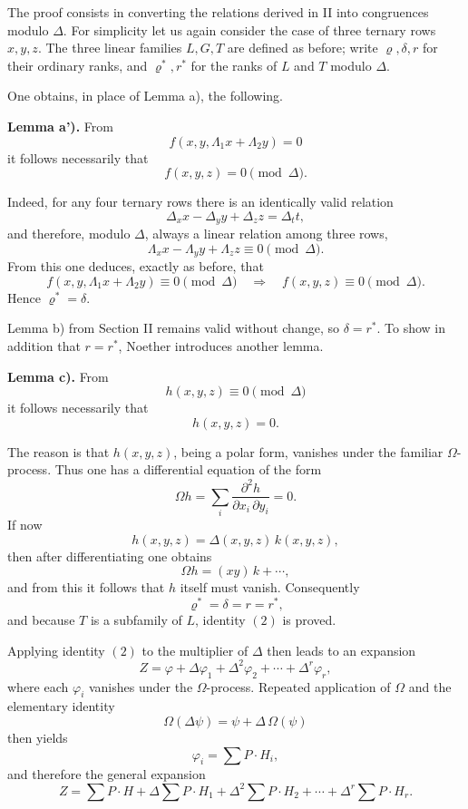 \documentclass[11pt]{article}
\begin{document}
The proof consists in converting the relations derived in II into congruences modulo \(\Delta\). For simplicity let us again consider the case of three ternary rows \(x,y,z\). The three linear families \(L,G,T\) are defined as before; write \(\varrho,\delta,r\) for their ordinary ranks, and \(\varrho^*,r^*\) for the ranks of \(L\) and \(T\) modulo \(\Delta\).

One obtains, in place of Lemma a), the following.

\medskip
\noindent\textbf{Lemma a').}
From
\[
f(x,y,\Lambda_1x+\Lambda_2y)=0
\]
it follows necessarily that
\[
f(x,y,z)=0\pmod{\Delta}.
\]

Indeed, for any four ternary rows there is an identically valid relation
\[
\Delta_x x-\Delta_y y+\Delta_z z=\Delta_t t,
\]
and therefore, modulo \(\Delta\), always a linear relation among three rows,
\[
\Lambda_x x-\Lambda_y y+\Lambda_z z\equiv 0 \pmod{\Delta}.
\]
From this one deduces, exactly as before, that
\[
f(x,y,\Lambda_1x+\Lambda_2y)\equiv 0 \pmod{\Delta}
\quad\Rightarrow\quad
f(x,y,z)\equiv 0 \pmod{\Delta}.
\]
Hence \(\varrho^*=\delta\).

Lemma b) from Section II remains valid without change, so \(\delta=r^*\). To show in addition that \(r=r^*\), Noether introduces another lemma.

\medskip
\noindent\textbf{Lemma c).}
From
\[
h(x,y,z)\equiv 0 \pmod{\Delta}
\]
it follows necessarily that
\[
h(x,y,z)=0.
\]

The reason is that \(h(x,y,z)\), being a polar form, vanishes under the familiar \(\Omega\)-process. Thus one has a differential equation of the form
\[
\Omega h=\sum_i \frac{\partial^2 h}{\partial x_i\,\partial y_i}=0.
\]
If now
\[
h(x,y,z)=\Delta(x,y,z)\,k(x,y,z),
\]
then after differentiating one obtains
\[
\Omega h=(xy)\,k+\cdots,
\]
and from this it follows that \(h\) itself must vanish. Consequently
\[
\varrho^*=\delta=r=r^*,
\]
and because \(T\) is a subfamily of \(L\), identity \((2)\) is proved.

Applying identity \((2)\) to the multiplier of \(\Delta\) then leads to an expansion
\[
Z=\varphi+\Delta\varphi_1+\Delta^2\varphi_2+\cdots+\Delta^r\varphi_r,
\]
where each \(\varphi_i\) vanishes under the \(\Omega\)-process. Repeated application of \(\Omega\) and the elementary identity
\[
\Omega(\Delta\psi)=\psi+\Delta\,\Omega(\psi)
\]
then yields
\[
\varphi_i=\sum P\cdot H_i,
\]
and therefore the general expansion
\[
Z=
\sum P\cdot H
+\Delta\sum P\cdot H_1
+\Delta^2\sum P\cdot H_2
+\cdots
+\Delta^r\sum P\cdot H_r.
\tag{3}
\]
\end{document}

